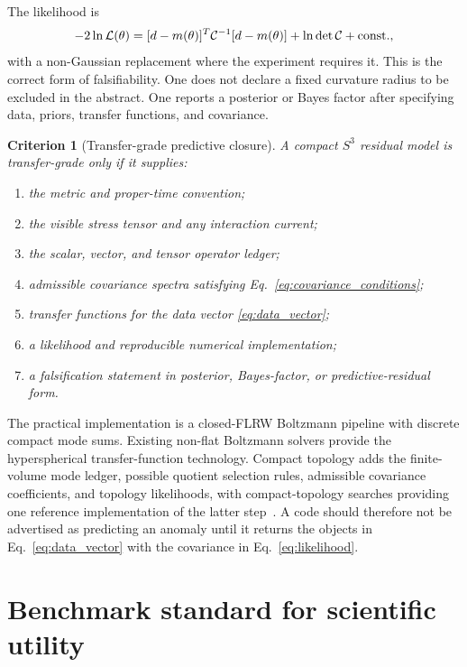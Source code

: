 \documentclass[
  aps,
  prd,
  reprint,
  superscriptaddress,
  nofootinbib,
  floatfix,
  longbibliography
]{revtex4-2}
\newtheorem{criterion}{Criterion}
\begin{document}
The likelihood is
\begin{equation}
  -2\ln{\cal L}(\theta)
  =
  [d-m(\theta)]^T{\cal C}^{-1}
  [d-m(\theta)]
  +\ln\det{\cal C}
  +\mathrm{const.},
  \label{eq:likelihood}
\end{equation}
with a non-Gaussian replacement where the experiment requires it.  This
is the correct form of falsifiability.  One does not declare a fixed
curvature radius to be excluded in the abstract.  One reports a posterior
or Bayes factor after specifying data, priors, transfer functions, and
covariance.

\begin{criterion}[Transfer-grade predictive closure]
A compact \(S^3\) residual model is transfer-grade only if it supplies:
\begin{enumerate}
\item the metric and proper-time convention;
\item the visible stress tensor and any interaction current;
\item the scalar, vector, and tensor operator ledger;
\item admissible covariance spectra satisfying
      Eq.~\eqref{eq:covariance_conditions};
\item transfer functions for the data vector \eqref{eq:data_vector};
\item a likelihood and reproducible numerical implementation;
\item a falsification statement in posterior, Bayes-factor, or
      predictive-residual form.
\end{enumerate}
\end{criterion}

The practical implementation is a closed-FLRW Boltzmann pipeline with
discrete compact mode sums.  Existing non-flat Boltzmann solvers provide
the hyperspherical transfer-function technology.  Compact topology adds
the finite-volume mode ledger, possible quotient selection rules,
admissible covariance coefficients, and topology likelihoods, with compact-topology searches providing one reference implementation of the latter step~\cite{SahaCompact2025}.  A code should
therefore not be advertised as predicting an anomaly until it returns
the objects in Eq.~\eqref{eq:data_vector} with the covariance in
Eq.~\eqref{eq:likelihood}.


\section{Benchmark standard for scientific utility}
\label{sec:benchmark}
\end{document}
